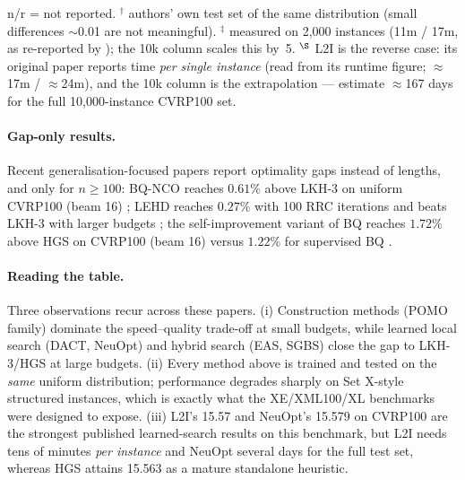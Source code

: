 \documentclass[11pt]{article}
\begin{document}
\begin{table}[ht]
\smallskip
\raggedright\footnotesize
n/r = not reported.\quad
$^\dagger$ authors' own test set of the same distribution (small differences
$\sim$0.01 are not meaningful).\quad
$^\ddagger$ measured on 2{,}000 instances (11m / 17m, as re-reported by
\citet{ma_learning_2022}); the 10k column scales this by~5.\quad
$^\S$ L2I is the reverse case: its original paper reports time \emph{per single
instance} (read from its runtime figure; $\approx$17m / $\approx$24m), and the 10k
column is the extrapolation --- \citet{ma_learning_2022} estimate $\approx$167 days for
the full 10{,}000-instance CVRP100 set.
\end{table}

\paragraph{Gap-only results.}
Recent generalisation-focused papers report optimality gaps instead of lengths, and only
for $n\ge100$: BQ-NCO reaches $0.61\%$ above LKH-3 on uniform CVRP100 (beam 16)
\citep{drakulic_bq-nco_2023}; LEHD reaches $0.27\%$ with 100 RRC iterations and beats
LKH-3 with larger budgets \citep{luo_neural_2023}; the self-improvement variant of BQ
reaches $1.72\%$ above HGS on CVRP100 (beam 16) versus $1.22\%$ for supervised BQ
\citep{pirnay_self-improvement_2024}.

\paragraph{Reading the table.}
Three observations recur across these papers. (i) Construction methods (POMO family)
dominate the speed--quality trade-off at small budgets, while learned local search
(DACT, NeuOpt) and hybrid search (EAS, SGBS) close the gap to LKH-3/HGS at large budgets.
(ii) Every method above is trained and tested on the \emph{same} uniform distribution;
performance degrades sharply on Set X-style structured instances, which is exactly what
the XE/XML100/XL benchmarks were designed to expose. (iii) L2I's 15.57 and NeuOpt's
15.579 on CVRP100 are the strongest published learned-search results on this benchmark,
but L2I needs tens of minutes \emph{per instance} and NeuOpt several days for the full
test set, whereas HGS attains 15.563 as a mature standalone heuristic.



\end{document}
